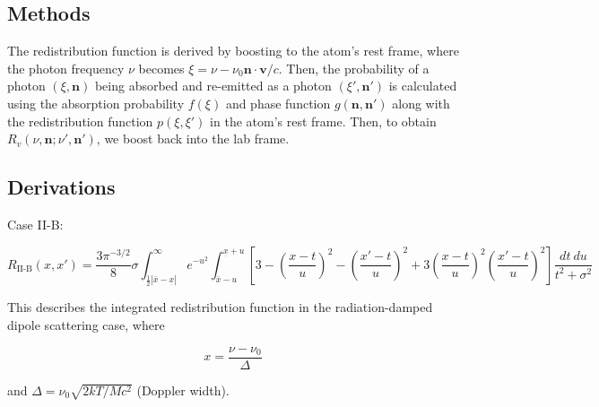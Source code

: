 \documentclass[onecolumn]{aastex63}
\begin{document}
\subsection{Methods}

The redistribution function is derived by boosting to the atom's rest frame, where the photon frequency $\nu$ becomes $\xi = \nu - \nu_0 \mathbf{n}\cdot \mathbf{v}/c$. Then, the probability of a photon $(\xi, \mathbf{n})$ being absorbed and re-emitted as a photon $(\xi', \mathbf{n}')$ is calculated using the absorption probability $f(\xi)$ and phase function $g(\mathbf{n}, \mathbf{n}')$ along with the redistribution function $p(\xi, \xi')$ in the atom's rest frame. Then, to obtain $R_v(\nu, \mathbf{n}; \nu', \mathbf{n}')$, we boost back into the lab frame.

\subsection{Derivations}

Case II-B:

\begin{equation}
    R_{\textrm{II-B}}(x, x') = \frac{3\pi^{-3/2}}{8}\sigma \int_{\frac{1}{2}|\bar{x} - \underset{\bar{}}{x}|}^{\infty} e^{-u^2}
    \int_{\bar{x}-u}^{\underset{\bar{}}{x}+u}\left[3 - \left(\frac{x-t}{u}\right)^2 - \left(\frac{x'-t}{u}\right)^2 + 3\left(\frac{x-t}{u}\right)^2\left(\frac{x'-t}{u}\right)^2\right]\frac{dt\ du}{t^2 + \sigma^2}
\end{equation}

This describes the integrated redistribution function in the radiation-damped dipole scattering case, where 

\begin{equation}
    x = \frac{\nu - \nu_0}{\Delta}
\end{equation}

and $\Delta = \nu_0 \sqrt{2kT/Mc^2}$ (Doppler width).
\end{document}
